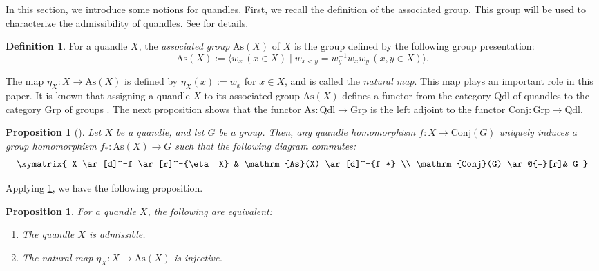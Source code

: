 \documentclass[dvipdfmx,12pt]{amsart}
\theoremstyle{plain}
\newtheorem{prop}[thm]{Proposition}
\theoremstyle{definition}
\newtheorem{dfn}[thm]{Definition}
\newcommand{\As}{\mathrm{As}}
\newcommand{\qop}{\triangleleft}
\newcommand{\Conj}{\mathrm{Conj}}
\newcommand{\Qdl}{\mathrm{Qdl}}
\newcommand{\Grp}{\mathrm{Grp}}
\begin{document}
In this section, we introduce some notions for quandles.
First, we recall the definition of the associated group.
This group will be used to characterize the admissibility of quandles.
See \cite[\S 8.8]{Kamada-2017-SurfaceKnots4Spacea} for details.
\begin{dfn}\label{def:associated_group}
  For a quandle $X$, the \emph{associated group} $\As(X)$ of $X$ is the group defined by the following group presentation:
  \[
    \As(X) := \langle w_x \, (x \in X) \mid w_{x \qop y} = w_y^{-1} w_x w_y \, (x, y \in X)\rangle.
  \]
\end{dfn}
The map $\eta_X: X \to \As(X)$ is defined by $\eta_X(x) := w_x$ for $x \in X$, 
and  is called the \emph{natural map}.
This map plays an important role in this paper.
It is known that assigning a quandle $X$ to its associated group $\As(X)$ defines a functor from the category $\Qdl$ of quandles to the category $\Grp$ of groups \cite[Proposition 8.8.3]{Kamada-2017-SurfaceKnots4Spacea}.
The next proposition shows that the functor $\As: \Qdl \to \Grp$ is the left adjoint to the functor $\Conj: \Grp \to \Qdl$.
\begin{prop}[{\cite[Proposition 8.8.4]{Kamada-2017-SurfaceKnots4Spacea}}]\label{prop:adjointness_As}
  Let $X$ be a quandle, and let $G$ be a group.
  Then, any quandle homomorphism $f: X \to \Conj(G)$ uniquely induces a group homomorphism $f_*: \As(X) \to G$ such that the following diagram commutes:
  \[
  \xymatrix{
    X \ar[d]^-f \ar[r]^-{\eta_X} & \As(X) \ar[d]^-{f_*} \\
    \Conj(G) \ar@{=}[r]& G
  }
  \]
\end{prop}


Applying \cref{prop:adjointness_As}, we have the following proposition.
\begin{prop}\label{prop:adm_vs_conj}
  For a quandle $X$, the following are equivalent:
  \begin{enumerate}
    \item[$1$] The quandle $X$ is admissible.
     \item[$2$] The natural map $\eta_X: X \to \As(X)$ is injective.
  \end{enumerate}
\end{prop}
\end{document}
